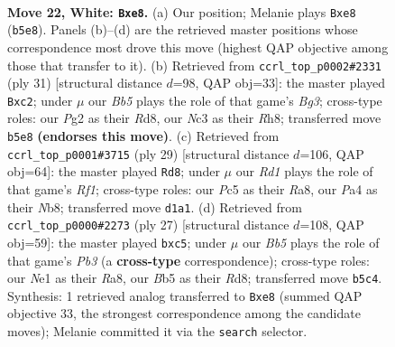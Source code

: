 \documentclass[11pt]{article}
\begin{document}
\clearpage

\begin{figure}[p]\centering
\begin{subfigure}{0.46\textwidth}\centering
\resizebox{\linewidth}{!}{%
\newchessgame
\chessboard[
  setfen={rn2bbr1/1pk3np/4p1p1/pBP3B1/P3P3/2N5/1P3RPP/3RN1K1 w - - 6 22},
  showmover=false,
  pgfstyle=straightmove, color=movearrow, markmove={b5-e8}
]}
\caption{}
\end{subfigure}\hfill
\begin{subfigure}{0.46\textwidth}\centering
\resizebox{\linewidth}{!}{%
\newchessgame
\chessboard[
  setfen={3rkb1r/pp3pp1/2n3b1/2P1P1Pp/5N2/2N1B3/PPR4P/4KB1R b Kk - 0 16},
  showmover=false,
  pgfstyle=straightmove, color=movearrow, markmove={g6-c2}
]}
\caption{}
\end{subfigure}
\\[4pt]
\begin{subfigure}{0.46\textwidth}\centering
\resizebox{\linewidth}{!}{%
\newchessgame
\chessboard[
  setfen={rn3rk1/p4ppp/b1pN1n2/8/Pp2P3/2P2P2/6PP/R2NKB1R b KQ - 0 15},
  showmover=false,
  pgfstyle=straightmove, color=movearrow, markmove={f8-d8}
]}
\caption{}
\end{subfigure}\hfill
\begin{subfigure}{0.46\textwidth}\centering
\resizebox{\linewidth}{!}{%
\newchessgame
\chessboard[
  setfen={r1br2k1/p3pp1p/1pn3pb/2P5/4P3/P1B2N2/1P2KPPP/3R1B1R b - - 4 14},
  showmover=false,
  pgfstyle=straightmove, color=movearrow, markmove={b6-c5}
]}
\caption{}
\end{subfigure}
\caption{\textbf{Move 22, White: \texttt{Bxe8}.} (a) Our position; Melanie plays \texttt{Bxe8} (\texttt{b5e8}). Panels (b)--(d) are the retrieved master positions whose correspondence most drove this move (highest QAP objective among those that transfer to it). (b) Retrieved from \texttt{ccrl\_top\_p0002\#2331} (ply 31) [structural distance $d$=98, QAP obj=33]: the master played \texttt{Bxc2}; under $\mu$ our \emph{Bb5} plays the role of that game's \emph{Bg3}; cross-type roles: our \emph{P}g2 as their \emph{R}d8, our \emph{N}c3 as their \emph{R}h8; transferred move \texttt{b5e8} \textbf{(endorses this move)}. (c) Retrieved from \texttt{ccrl\_top\_p0001\#3715} (ply 29) [structural distance $d$=106, QAP obj=64]: the master played \texttt{Rd8}; under $\mu$ our \emph{Rd1} plays the role of that game's \emph{Rf1}; cross-type roles: our \emph{P}c5 as their \emph{R}a8, our \emph{P}a4 as their \emph{N}b8; transferred move \texttt{d1a1}. (d) Retrieved from \texttt{ccrl\_top\_p0000\#2273} (ply 27) [structural distance $d$=108, QAP obj=59]: the master played \texttt{bxc5}; under $\mu$ our \emph{Bb5} plays the role of that game's \emph{Pb3} (a \textbf{cross-type} correspondence); cross-type roles: our \emph{N}e1 as their \emph{R}a8, our \emph{B}b5 as their \emph{R}d8; transferred move \texttt{b5c4}. Synthesis: 1 retrieved analog transferred to \texttt{Bxe8} (summed QAP objective 33, the strongest correspondence among the candidate moves); Melanie committed it via the \texttt{search} selector.}
\label{fig:thought-m42}
\end{figure}
\end{document}
